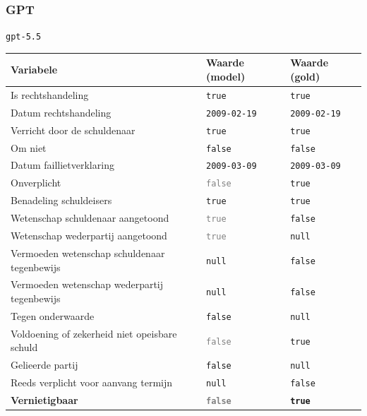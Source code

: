 \documentclass[
  dutch,
  a4paper,
]{article}
\begin{document}
\newpage


\subsubsection{GPT}\label{gpt-27}

\texttt{gpt-5.5}

\begin{center}
\small
\begin{tabular}{@{}p{7.4cm}p{2.6cm}p{2.6cm}@{}}
\toprule
Variabele & Waarde (model) & Waarde (gold) \\
\midrule
Is rechtshandeling & \texttt{true} & \texttt{true} \\
Datum rechtshandeling & \texttt{2009-02-19} & \texttt{2009-02-19} \\
Verricht door de schuldenaar & \texttt{true} & \texttt{true} \\
Om niet & \texttt{false} & \texttt{false} \\
Datum faillietverklaring & \texttt{2009-03-09} & \texttt{2009-03-09} \\
Onverplicht & \textcolor{gray}{\texttt{false}} & \texttt{true} \\
Benadeling schuldeisers & \texttt{true} & \texttt{true} \\
Wetenschap schuldenaar aangetoond & \textcolor{gray}{\texttt{true}} & \texttt{false} \\
Wetenschap wederpartij aangetoond & \textcolor{gray}{\texttt{true}} & \texttt{null} \\
Vermoeden wetenschap schuldenaar tegenbewijs & \texttt{null} & \texttt{false} \\
Vermoeden wetenschap wederpartij tegenbewijs & \texttt{null} & \texttt{false} \\
Tegen onderwaarde & \texttt{false} & \texttt{null} \\
Voldoening of zekerheid niet opeisbare schuld & \textcolor{gray}{\texttt{false}} & \texttt{true} \\
Gelieerde partij & \texttt{false} & \texttt{null} \\
Reeds verplicht voor aanvang termijn & \texttt{null} & \texttt{false} \\
\textbf{Vernietigbaar} & \textbf{\textcolor{gray}{\texttt{false}}} & \textbf{\texttt{true}} \\
\bottomrule
\end{tabular}
\end{center}
\end{document}
